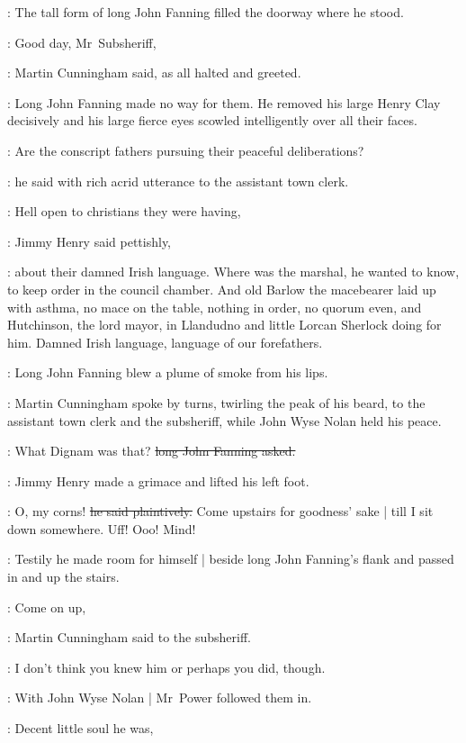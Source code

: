 :
The tall form of long John Fanning
filled the doorway where he stood.

\cunningham:
Good day, Mr~Subsheriff,

:
Martin Cunningham said,
as all halted and greeted.%

:
Long John Fanning made no way for them.
He removed his large Henry Clay decisively
and his large fierce eyes scowled intelligently over all their faces.

\longjohn:
Are the conscript fathers pursuing their peaceful deliberations?

:
he said with rich acrid utterance
to the assistant town clerk.

\jimmyhenry:
Hell open to christians they were having,

:
Jimmy Henry said pettishly,

\jimmyhenry:
about their damned Irish language.
Where was the marshal,
he wanted to know,
to keep order in the council chamber.
And old Barlow the macebearer
laid up with asthma,
no mace on the table,
nothing in order,
no quorum even,%
and Hutchinson, the lord mayor, in Llandudno
and little Lorcan Sherlock doing  for him.
Damned Irish language,
language of our forefathers.

:
Long John Fanning blew a plume of smoke from his lips.

:
Martin Cunningham spoke by turns,
twirling the peak of his beard,
to the assistant town clerk and the subsheriff,
while John Wyse Nolan held his peace.

\longjohn:
What Dignam was that?
\sout{long John Fanning asked.}

:
Jimmy Henry made a grimace and lifted his left foot.

\jimmyhenry:
O, my corns!
\sout{he said plaintively.}
Come upstairs for goodness' sake |
till I sit down somewhere.%
Uff!
Ooo!
Mind!

:
Testily he made room for himself |
beside long John Fanning's flank
and passed in and up the stairs.

\cunningham:
Come on up,

:
Martin Cunningham said to the subsheriff.

\cunningham:
I don't think you knew him
or perhaps you did, though.

:
With John Wyse Nolan |
Mr~Power followed them in.

\power:
Decent little soul he was,

